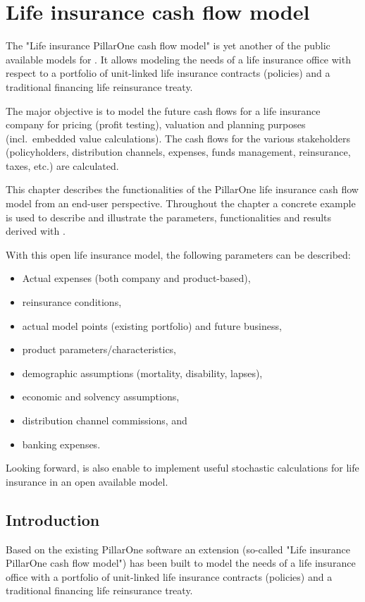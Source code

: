 \chapter{Life insurance cash flow model}
\label{chap:licfm}

The "Life insurance PillarOne cash flow model" is yet another of the public available models for \RA . It allows modeling the needs of a life insurance office with respect to a portfolio of unit-linked life insurance contracts (policies) and a traditional financing life reinsurance treaty.

The major objective is to model the future cash flows for a life insurance company for pricing (profit testing), valuation and planning purposes (incl.~embedded value calculations). The cash flows for the various stakeholders (policyholders, distribution channels, expenses, funds management, reinsurance, taxes, etc.) are calculated.

This chapter describes the functionalities of the PillarOne life insurance cash flow model from an end-user perspective. Throughout the chapter a concrete example is used to describe and illustrate the parameters, functionalities and results derived with \RA .

With this open life insurance model, the  following parameters can be described: 
\begin{itemize}
	\item Actual expenses (both company and product-based), 
	\item reinsurance conditions, 
	\item actual model points (existing portfolio) and future business, 
	\item product parameters/characteristics, 
	\item demographic assumptions (mortality, disability, lapses),
	\item economic and solvency assumptions, 
	\item distribution channel commissions, and 
	\item banking expenses.
\end{itemize}

Looking forward, \RA is also enable to implement useful stochastic calculations for life insurance in an open available model.

\section{Introduction}

Based on the existing PillarOne software an extension (so-called "Life insurance PillarOne cash flow model") has been built to model the needs of a life insurance office with a portfolio of unit-linked life insurance contracts (policies) and a traditional financing life reinsurance treaty. 

